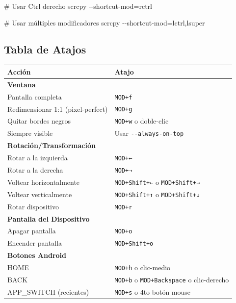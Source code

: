 \documentclass[
  doc,
  floatsintext,
  longtable,
  a4paper,
  nolmodern,
  notxfonts,
  notimes,
  12pt,
  colorlinks=true,linkcolor=blue,citecolor=blue,urlcolor=blue]{apa7}
\newenvironment{Shaded}{\begin{snugshade}}{\end{snugshade}}
\newcommand{\AttributeTok}[1]{\textcolor[rgb]{0.40,0.45,0.13}{#1}}
\newcommand{\CommentTok}[1]{\textcolor[rgb]{0.37,0.37,0.37}{#1}}
\newcommand{\ExtensionTok}[1]{\textcolor[rgb]{0.00,0.23,0.31}{#1}}
\newcommand{\NormalTok}[1]{\textcolor[rgb]{0.00,0.23,0.31}{#1}}
\newcommand{\OperatorTok}[1]{\textcolor[rgb]{0.37,0.37,0.37}{#1}}
\newcounter{none} %
\begin{document}
\begin{Shaded}
\begin{Highlighting}[]
\CommentTok{\# Usar Ctrl derecho}
\ExtensionTok{scrcpy} \AttributeTok{{-}{-}shortcut{-}mod}\OperatorTok{=}\NormalTok{rctrl}

\CommentTok{\# Usar múltiples modificadores}
\ExtensionTok{scrcpy} \AttributeTok{{-}{-}shortcut{-}mod}\OperatorTok{=}\NormalTok{lctrl,lsuper}
\end{Highlighting}
\end{Shaded}

\subsection{Tabla de Atajos}\label{tabla-de-atajos}

{\def\LTcaptype{none} %
\begin{longtable}[]{@{}ll@{}}
\toprule\noalign{}
Acción & Atajo \\
\midrule\noalign{}
\endhead
\bottomrule\noalign{}
\endlastfoot
\textbf{Ventana} & \\
Pantalla completa & \texttt{MOD+f} \\
Redimensionar 1:1 (pixel-perfect) & \texttt{MOD+g} \\
Quitar bordes negros & \texttt{MOD+w} o doble-clic \\
Siempre visible & Usar \texttt{-\/-always-on-top} \\
\textbf{Rotación/Transformación} & \\
Rotar a la izquierda & \texttt{MOD+←} \\
Rotar a la derecha & \texttt{MOD+→} \\
Voltear horizontalmente & \texttt{MOD+Shift+←} o \texttt{MOD+Shift+→} \\
Voltear verticalmente & \texttt{MOD+Shift+↑} o \texttt{MOD+Shift+↓} \\
Rotar dispositivo & \texttt{MOD+r} \\
\textbf{Pantalla del Dispositivo} & \\
Apagar pantalla & \texttt{MOD+o} \\
Encender pantalla & \texttt{MOD+Shift+o} \\
\textbf{Botones Android} & \\
HOME & \texttt{MOD+h} o clic-medio \\
BACK & \texttt{MOD+b} o \texttt{MOD+Backspace} o clic-derecho \\
APP\_SWITCH (recientes) & \texttt{MOD+s} o 4to botón mouse \\

\end{longtable}}
\end{document}
